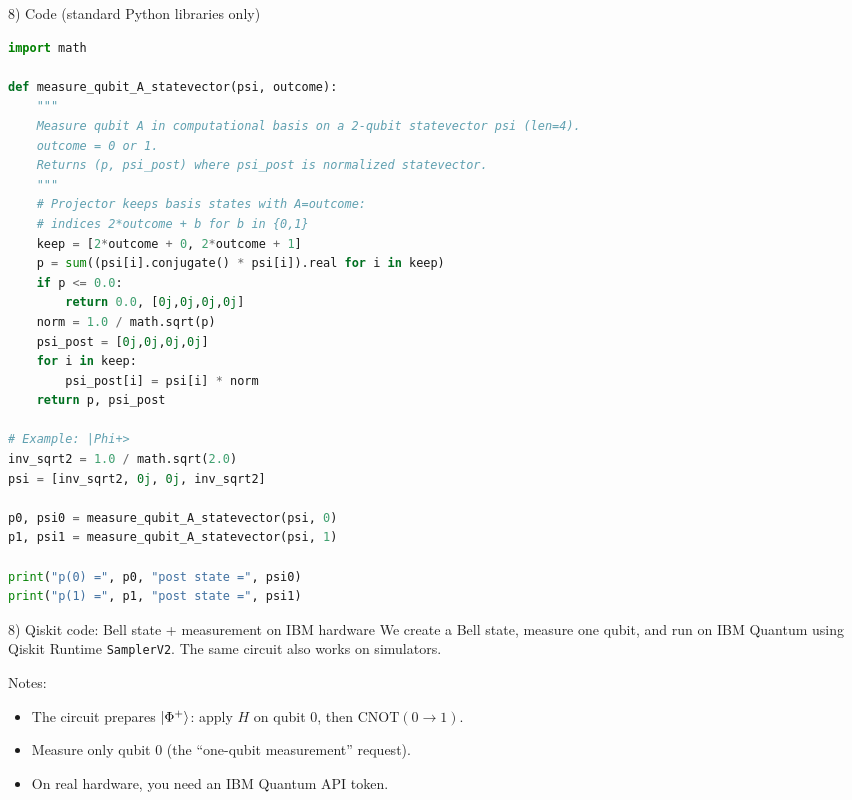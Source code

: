 \documentclass[aspectratio=169]{beamer}
\begin{document}
\begin{frame}[fragile]{8) Code (standard Python libraries only)}
\begin{lstlisting}[language=Python]
import math

def measure_qubit_A_statevector(psi, outcome):
    """
    Measure qubit A in computational basis on a 2-qubit statevector psi (len=4).
    outcome = 0 or 1.
    Returns (p, psi_post) where psi_post is normalized statevector.
    """
    # Projector keeps basis states with A=outcome:
    # indices 2*outcome + b for b in {0,1}
    keep = [2*outcome + 0, 2*outcome + 1]
    p = sum((psi[i].conjugate() * psi[i]).real for i in keep)
    if p <= 0.0:
        return 0.0, [0j,0j,0j,0j]
    norm = 1.0 / math.sqrt(p)
    psi_post = [0j,0j,0j,0j]
    for i in keep:
        psi_post[i] = psi[i] * norm
    return p, psi_post

# Example: |Phi+>
inv_sqrt2 = 1.0 / math.sqrt(2.0)
psi = [inv_sqrt2, 0j, 0j, inv_sqrt2]

p0, psi0 = measure_qubit_A_statevector(psi, 0)
p1, psi1 = measure_qubit_A_statevector(psi, 1)

print("p(0) =", p0, "post state =", psi0)
print("p(1) =", p1, "post state =", psi1)
\end{lstlisting}
\end{frame}

\begin{frame}{8) Qiskit code: Bell state + measurement on IBM hardware}
We create a Bell state, measure one qubit, and run on IBM Quantum using
Qiskit Runtime \texttt{SamplerV2}. The same circuit also works on simulators.

\medskip
Notes:
\begin{itemize}
\item The circuit prepares $\ket{\Phi^+}$: apply $H$ on qubit 0, then $\mathrm{CNOT}(0\to1)$.
\item Measure only qubit 0 (the ``one-qubit measurement'' request).
\item On real hardware, you need an IBM Quantum API token.
\end{itemize}
\end{frame}
\end{document}
